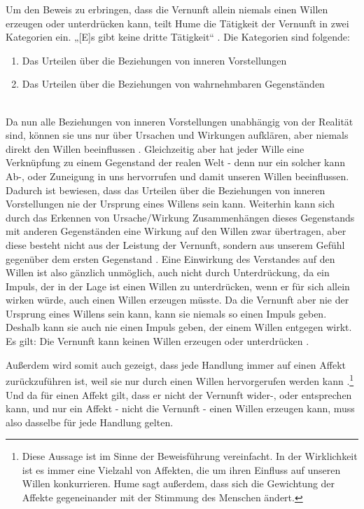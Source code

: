 \documentclass[ngerman,12pt]{diazessay} %
\begin{document}
\begin{doublespace}
Um den Beweis zu erbringen, dass die Vernunft allein niemals einen Willen erzeugen oder unterdrücken kann, teilt Hume die Tätigkeit der Vernunft in zwei Kategorien ein. „[E]s gibt keine dritte Tätigkeit“ \cite[S.540]{Hume.2013}. Die Kategorien sind folgende:
\begin{enumerate}
	\item Das Urteilen über die Beziehungen von inneren Vorstellungen
	\item Das Urteilen über die Beziehungen von wahrnehmbaren Gegenständen
\end{enumerate}
\cite[vgl. S.540]{Hume.2013} \\
Da nun alle Beziehungen von inneren Vorstellungen unabhängig von der Realität sind, können sie uns nur über Ursachen und Wirkungen aufklären, aber niemals direkt den Willen beeinflussen \cite[siehe S.484]{Hume.2013}. Gleichzeitig aber hat jeder Wille eine Verknüpfung zu einem Gegenstand der realen Welt - denn nur ein solcher kann Ab-, oder Zuneigung in uns hervorrufen und damit unseren Willen beeinflussen. Dadurch ist bewiesen, dass das Urteilen über die Beziehungen von inneren Vorstellungen nie der Ursprung eines Willens sein kann. Weiterhin kann sich durch das Erkennen von Ursache/Wirkung Zusammenhängen dieses Gegenstands mit anderen Gegenständen eine Wirkung auf den Willen zwar übertragen, aber diese besteht nicht aus der Leistung der Vernunft, sondern aus unserem Gefühl gegenüber dem ersten Gegenstand \cite[siehe S.485]{Hume.2013}. Eine Einwirkung des Verstandes auf den Willen ist also gänzlich unmöglich, auch nicht durch Unterdrückung, da ein Impuls, der in der Lage ist einen Willen zu unterdrücken, wenn er für sich allein wirken würde, auch einen Willen erzeugen müsste. Da die Vernunft aber nie der Ursprung eines Willens sein kann, kann sie niemals so einen Impuls geben. Deshalb kann sie auch nie einen Impuls geben, der einem Willen entgegen wirkt. Es gilt: Die Vernunft kann keinen Willen erzeugen oder unterdrücken \cite[S.486]{Hume.2013}. 
\par\bigskip 
Außerdem wird somit auch gezeigt, dass jede Handlung immer auf einen Affekt zurückzuführen ist, weil sie nur durch einen Willen hervorgerufen werden kann \cite[siehe S.489]{Hume.2013}.\footnote{Diese Aussage ist im Sinne der Beweisführung vereinfacht. In der Wirklichkeit ist es immer eine Vielzahl von Affekten, die um ihren Einfluss auf unseren Willen konkurrieren. Hume sagt außerdem, dass sich die Gewichtung der Affekte gegeneinander mit der Stimmung des Menschen ändert.} Und da für einen Affekt gilt, dass er nicht der Vernunft wider-, oder entsprechen kann, und nur ein Affekt - nicht die Vernunft - einen Willen erzeugen kann, muss also dasselbe für jede Handlung gelten.


\end{doublespace}
\end{document}
